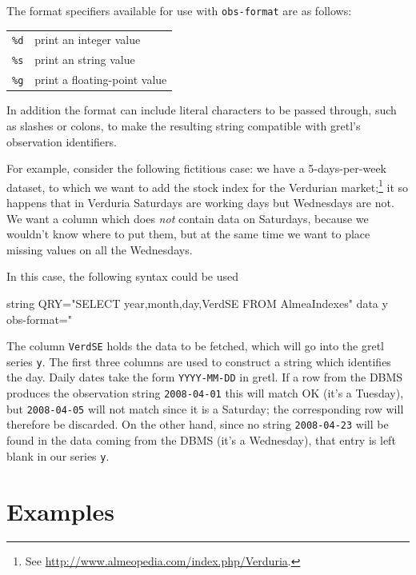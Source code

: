The format specifiers available for use with \texttt{obs-format} are
as follows:

\begin{center}
\begin{tabular}{ll}
\texttt{\%d} & print an integer value \\
\texttt{\%s} & print an string value \\
\texttt{\%g} & print a floating-point value \\
\end{tabular}
\end{center}

In addition the format can include literal characters to be passed
through, such as slashes or colons, to make the resulting string
compatible with gretl's observation identifiers.

For example, consider the following fictitious case: we have a
5-days-per-week dataset, to which we want to add the stock index for
the Verdurian market;\footnote{See
  \url{http://www.almeopedia.com/index.php/Verduria}.} it so
happens that in Verduria Saturdays are working days but Wednesdays are
not. We want a column which does \emph{not} contain data on
Saturdays, because we wouldn't know where to put them, but at the same
time we want to place missing values on all the Wednesdays.

In this case, the following syntax could be used
%
\begin{code}
  string QRY="SELECT year,month,day,VerdSE FROM AlmeaIndexes"
  data y obs-format="%
\end{code}
%
The column \texttt{VerdSE} holds the data to be fetched, which will go
into the gretl series \texttt{y}. The first three columns are
used to construct a string which identifies the day. Daily dates take
the form \texttt{YYYY-MM-DD} in gretl.  If a row from the DBMS
produces the observation string \texttt{2008-04-01} this will match OK
(it's a Tuesday), but \texttt{2008-04-05} will not match since it is a
Saturday; the corresponding row will therefore be discarded.  On the
other hand, since no string \texttt{2008-04-23} will be found in the
data coming from the DBMS (it's a Wednesday), that entry is left blank
in our series \texttt{y}.

\section{Examples}
\label{sec:odbc-examples}

